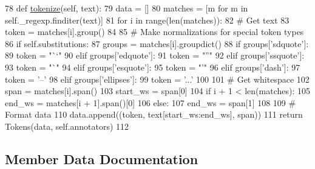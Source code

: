 \begin{DoxyCode}
78     \textcolor{keyword}{def }\hyperlink{namespaceparlai_1_1agents_1_1tfidf__retriever_1_1build__tfidf_a1fdb457e98eb4e4c26047e229686a616}{tokenize}(self, text):
79         data = []
80         matches = [m \textcolor{keywordflow}{for} m \textcolor{keywordflow}{in} self.\_regexp.finditer(text)]
81         \textcolor{keywordflow}{for} i \textcolor{keywordflow}{in} range(len(matches)):
82             \textcolor{comment}{# Get text}
83             token = matches[i].group()
84 
85             \textcolor{comment}{# Make normalizations for special token types}
86             \textcolor{keywordflow}{if} self.substitutions:
87                 groups = matches[i].groupdict()
88                 \textcolor{keywordflow}{if} groups[\textcolor{stringliteral}{'sdquote'}]:
89                     token = \textcolor{stringliteral}{"``"}
90                 \textcolor{keywordflow}{elif} groups[\textcolor{stringliteral}{'edquote'}]:
91                     token = \textcolor{stringliteral}{"''"}
92                 \textcolor{keywordflow}{elif} groups[\textcolor{stringliteral}{'ssquote'}]:
93                     token = \textcolor{stringliteral}{"`"}
94                 \textcolor{keywordflow}{elif} groups[\textcolor{stringliteral}{'esquote'}]:
95                     token = \textcolor{stringliteral}{"'"}
96                 \textcolor{keywordflow}{elif} groups[\textcolor{stringliteral}{'dash'}]:
97                     token = \textcolor{stringliteral}{'--'}
98                 \textcolor{keywordflow}{elif} groups[\textcolor{stringliteral}{'ellipses'}]:
99                     token = \textcolor{stringliteral}{'...'}
100 
101             \textcolor{comment}{# Get whitespace}
102             span = matches[i].span()
103             start\_ws = span[0]
104             \textcolor{keywordflow}{if} i + 1 < len(matches):
105                 end\_ws = matches[i + 1].span()[0]
106             \textcolor{keywordflow}{else}:
107                 end\_ws = span[1]
108 
109             \textcolor{comment}{# Format data}
110             data.append((token, text[start\_ws:end\_ws], span))
111         \textcolor{keywordflow}{return} Tokens(data, self.annotators)
112 \end{DoxyCode}


\subsection{Member Data Documentation}
\mbox{\label{classparlai_1_1agents_1_1tfidf__retriever_1_1tokenizers_1_1regexp__tokenizer_1_1RegexpTokenizer_a7571f6fa8c50eb037d740ec38ea59099}} 

